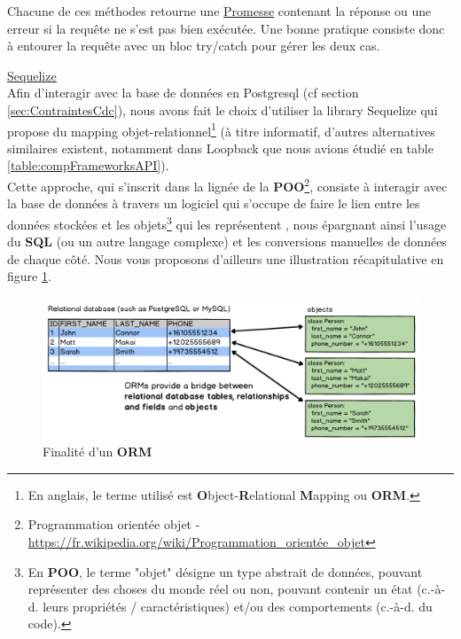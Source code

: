Chacune de ces méthodes retourne une \href{https://developer.mozilla.org/fr/docs/Web/JavaScript/Guide/Utiliser_les_promesses}{Promesse} contenant la réponse ou une erreur si la requête ne s'est pas bien exécutée. Une bonne pratique consiste donc à entourer la requête avec un bloc try/catch pour gérer les deux cas.\\


\noindent\underline{\href{https://sequelize.org/master/}{Sequelize}}\\

Afin d'interagir avec la base de données en Postgresql (cf section \ref{sec:ContraintesCdc}), nous avons fait le choix d'utiliser la \gls{library} Sequelize qui propose du mapping objet-relationnel\footnote{
    En anglais, le terme utilisé est \textbf{O}bject-\textbf{R}elational \textbf{M}apping ou \textbf{ORM}.
} (à titre informatif, d'autres alternatives similaires existent, notamment dans Loopback que nous avions étudié en table \ref{table:compFrameworksAPI}).\\

Cette approche, qui s'inscrit dans la lignée de la \textbf{POO}\footnote{
    Programmation orientée objet -
    \href{https://fr.wikipedia.org/wiki/Programmation\_orient\%C3\%A9e\_objet}{https://fr.wikipedia.org/wiki/Programmation\_orientée\_objet}
}, consiste à interagir avec la base de données à travers un logiciel qui s'occupe de faire le lien entre les données stockées et les objets\footnote{
    En \textbf{POO}, le terme "objet" désigne un type abstrait de données, pouvant représenter des choses du monde réel ou non, pouvant contenir un état (c.-à-d. leurs propriétés / caractéristiques) et/ou des comportements (c.-à-d. du code).
} qui les représentent
, nous épargnant ainsi l'usage du \textbf{SQL} (ou un autre langage complexe) et les conversions manuelles de données de chaque côté. 
Nous vous proposons d'ailleurs une illustration récapitulative en figure \ref{fig:ORMExplanations}.

\begin{figure}[H]
    \includegraphics[width=\textwidth,height=\textheight,keepaspectratio]{images/libraries/orms-bridge.png}
    \centering
    \caption[Finalité d'un \textbf{ORM}]{Finalité d'un \textbf{ORM}}
    \label{fig:ORMExplanations}
\end{figure}

